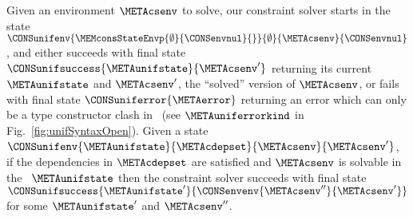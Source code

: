 \documentclass{jfp1}
\begin{document}
%
%
Given an environment $\METAcsenv$ to solve, our constraint solver
starts in the state
$\CONSunifenv{\MEMconsStateEnvp{\emptyset}{\CONSenvnul}{}}{\emptyset}{\METAcsenv}{\CONSenvnul}$,
%
and either succeeds with final state
$\CONSunifsuccess{\METAunifstate}{\METAcsenv'}$
returning its current \CONTEXT\ $\METAunifstate$ and $\METAcsenv'$,
the ``solved'' version of $\METAcsenv$, or
fails with final state $\CONSuniferror{\METAerror}$
returning an error which can only be a type constructor clash in
\CORETES\ (see $\METAuniferrorkind$ in
Fig.~\ref{fig:unifSyntaxOpen}).
%
%
%
Given a state $\CONSunifenv{\METAunifstate}{\METAcdepset}{\METAcsenv}{\METAcsenv'}$,
if the dependencies in $\METAcdepset$ are satisfied
and $\METAcsenv$ is solvable in the \CCONTEXT\ $\METAunifstate$
then the constraint solver succeeds with final state
$\CONSunifsuccess{\METAunifstate'}{\CONSenvenv{\METAcsenv''}{\METAcsenv'}}$
for some $\METAunifstate'$ and $\METAcsenv''$.


\end{document}
